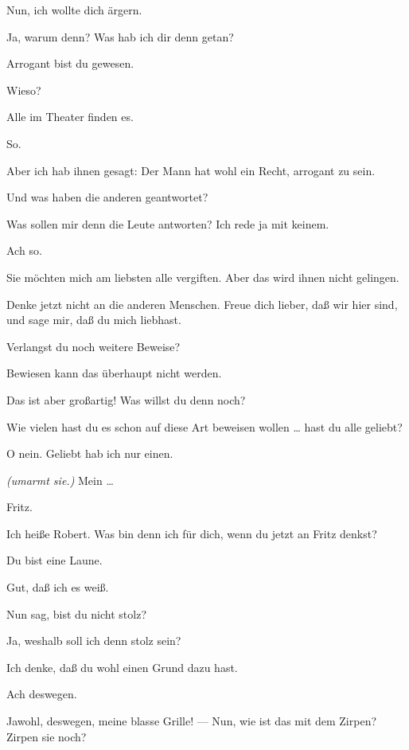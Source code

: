 \documentclass[
	final,
	a4paper,
	ngerman,
	mpinclude = true, %
	twoside = true,
	open = right,
	cleardoublepage = plain,
	DIV = 13,
	BCOR = 1cm,
	titlepage = firstiscover,
	]{scrbook}
\newcommand{\direction}[1]{\textit{(#1)}}
\newcommand{\thecharacter}[1]{\textup{\textsc{#1}}}
\newcommand{\thedichter}{\thecharacter{Dichter}}
\newcommand{\theschauspielerin}{\thecharacter{Schauspielerin}}
\newcommand{\character}[1]{\item[#1:]}
\newcommand{\dichter}{\character{\thedichter}}
\newcommand{\schauspielerin}{\character{\theschauspielerin}}
\begin{document}
\begin{play}
	\schauspielerin
	Nun, ich wollte dich ärgern.

	\dichter
	Ja, warum denn? Was hab ich dir denn getan?

	\schauspielerin
	Arrogant bist du gewesen.

	\dichter
	Wieso?

	\schauspielerin
	Alle im Theater finden es.

	\dichter
	So.

	\schauspielerin
	Aber ich hab ihnen gesagt: Der Mann hat wohl ein Recht, arrogant zu sein.

	\dichter
	Und was haben die anderen geantwortet?

	\schauspielerin
	Was sollen mir denn die Leute antworten? Ich rede ja mit keinem.

	\dichter
	Ach so.

	\schauspielerin
	Sie möchten mich am liebsten alle vergiften. Aber das wird ihnen nicht gelingen.

	\dichter
	Denke jetzt nicht an die anderen Menschen. Freue dich lieber, daß wir hier sind, und sage mir, daß du mich liebhast.

	\schauspielerin
	Verlangst du noch weitere Beweise?

	\dichter
	Bewiesen kann das überhaupt nicht werden.

	\schauspielerin
	Das ist aber großartig! Was willst du denn noch?

	\dichter
	Wie vielen hast du es schon auf diese Art beweisen wollen \ldots{} hast du alle geliebt?

	\schauspielerin
	O nein. Geliebt hab ich nur einen.

	\dichter
	\direction{umarmt sie.} Mein \ldots{}

	\schauspielerin
	Fritz.

	\dichter
	Ich heiße Robert. Was bin denn ich für dich, wenn du jetzt an Fritz denkst?

	\schauspielerin
	Du bist eine Laune.

	\dichter
	Gut, daß ich es weiß.

	\schauspielerin
	Nun sag, bist du nicht stolz?

	\dichter
	Ja, weshalb soll ich denn stolz sein?

	\schauspielerin
	Ich denke, daß du wohl einen Grund dazu hast.

	\dichter
	Ach deswegen.

	\schauspielerin
	Jawohl, deswegen, meine blasse Grille! --- Nun, wie ist das mit dem Zirpen? Zirpen sie noch?


\end{play}
\end{document}
